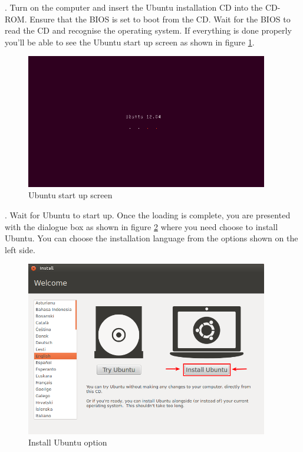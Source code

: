 \par {}. Turn on the computer and insert the Ubuntu installation CD into the CD-ROM. Ensure that the BIOS is set to boot from the CD. Wait for the BIOS to read the CD and recognise the operating system. If everything is done properly you'll be able to see the Ubuntu start up screen as shown in figure \ref{fig:basic-start}.

\begin{figure}[h!]	
	\begin{center}
	\includegraphics[width=300pt]{./images/installation/basic-start.png}
	\caption{Ubuntu start up screen}	
	\label{fig:basic-start}	
	\end{center}
\end{figure}

\par {}. Wait for Ubuntu to start up. Once the loading is complete, you are presented with the dialogue box as shown in figure \ref{fig:install-live-options} where you need choose to install Ubuntu. You can choose the installation language from the options shown on the left side.\\

\begin{figure}[!h]	
	\begin{center}
	\includegraphics[width=300pt]{./images/installation/install-live-start2.png}
	\caption{Install Ubuntu option}	
	\label{fig:install-live-options}	
	\end{center}
\end{figure}

